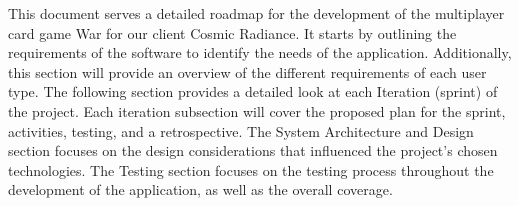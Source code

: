 This document serves a detailed roadmap for the development of the multiplayer card game War for our client Cosmic Radiance. It starts by outlining the requirements of the software to identify the needs of the application. Additionally, this section will provide an overview of the different requirements of each user type. The following section provides a detailed look at each Iteration (sprint) of the project. Each iteration subsection will cover the proposed plan for the sprint, activities, testing, and a retrospective. The System Architecture and Design section focuses on the design considerations that influenced the project's chosen technologies. The Testing section focuses on the testing process throughout the development of the application, as well as the overall coverage. 
 
 
  




